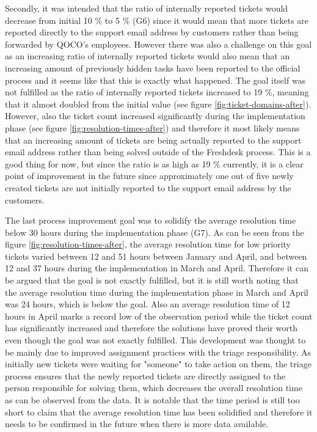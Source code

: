 Secondly, it was intended that the ratio of internally reported tickets would decrease from initial 10 \% to 5 \% (G6) since it would mean that more tickets are reported directly to the support email address by
customers rather than being forwarded by QOCO's employees. However there was also a challenge on this goal as an increasing ratio of internally reported tickets would also mean that an increasing amount of
previously hidden tasks have been reported to the official process and it seems like that this is exactly what happened. The goal itself was not fulfilled as the ratio of internally reported tickets increased
to 19 \%, meaning that it almost doubled from the initial value (see figure \ref{fig:ticket-domains-after}). However, also the ticket count increased significantly during the implementation phase
(see figure \ref{fig:resolution-times-after}) and therefore it
most likely means that an increasing amount of tickets are being actually reported to the support email address rather than being solved outside of the Freshdesk process. This is a good thing for now, but since the
ratio is as high as 19 \% currently, it is a clear point of improvement in the future since approximately one out of five newly created tickets are not initially reported to the support email address by the customers.

The last process improvement goal was to solidify the average resolution time below 30 hours during the implementation phase (G7). As can be seen from the figure \ref{fig:resolution-times-after}, the average resolution time
for low priority tickets varied between 12 and 51 hours between January and April, and between 12 and 37 hours during the implementation in March and April. Therefore it can be argued that the goal is not
exactly fulfilled, but it is still worth noting that the average resolution time during the implementation phase
in March and April was 24 hours, which is below the goal. Also an average resolution time of 12 hours in April marks a record
low of the observation period while the ticket count has significantly increased and therefore the solutions have proved their worth even though the goal was not exactly fulfilled. This development was thought
to be mainly due to improved assignment practices with the triage responsibility. As initially new tickets were waiting for "someone" to take action on them, the triage process ensures that the newly reported
tickets are directly assigned to the person responsible for solving them, which decreases the overall resolution time as can be observed from the data. It is notable that the time period is still too
short to claim that the average resolution time has been solidified and therefore it needs to be confirmed in the future when there is more data available.

